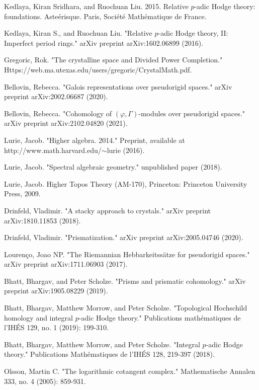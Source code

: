 \documentclass[11pt]{book}
\theoremstyle{definition}
\numberwithin{equation}{section}
\begin{document}
\begin{thebibliography}{10}
 Kedlaya, Kiran Sridhara, and Ruochuan Liu. 2015. Relative $p$-adic Hodge theory: foundations. Aste\'erisque. Paris, Soci\'et\'e Math\'ematique de France.

 Kedlaya, Kiran S., and Ruochuan Liu. "Relative $p$-adic Hodge theory, II: Imperfect period rings." arXiv preprint arXiv:1602.06899 (2016).


 Gregoric, Rok. "The crystalline space and Divided Power Completion." Https://web.ma.utexas.edu/users/gregoric/CrystalMath.pdf.


 Bellovin, Rebecca. "Galois representations over pseudorigid spaces." arXiv preprint arXiv:2002.06687 (2020).

 Bellovin, Rebecca. "Cohomology of $(\varphi,\Gamma) $-modules over pseudorigid spaces." arXiv preprint arXiv:2102.04820 (2021).



 Lurie, Jacob. "Higher algebra. 2014." Preprint, available at http://www.math.harvard.edu/$\sim$lurie (2016).

 Lurie, Jacob. "Spectral algebraic geometry." unpublished paper (2018).

 Lurie, Jacob. Higher Topos Theory (AM-170), Princeton: Princeton University Press, 2009. 

 Drinfeld, Vladimir. "A stacky approach to crystals." arXiv preprint arXiv:1810.11853 (2018).

 Drinfeld, Vladimir. "Prismatization." arXiv preprint arXiv:2005.04746 (2020). 


 Louren\c{c}o, Joao NP. "The Riemannian Hebbarkeitss\" atze for pseudorigid spaces." arXiv preprint arXiv:1711.06903 (2017).


 Bhatt, Bhargav, and Peter Scholze. "Prisms and prismatic cohomology." arXiv preprint arXiv:1905.08229 (2019).


 Bhatt, Bhargav, Matthew Morrow, and Peter Scholze. "Topological Hochschild homology and integral $ p $-adic Hodge theory." Publications math\'ematiques de l'IH\'ES 129, no. 1 (2019): 199-310.

 Bhatt, Bhargav, Matthew Morrow, and Peter Scholze. "Integral $p$-adic Hodge theory." Publications Math\'ematiques de l'IH\'ES 128, 219-397 (2018). 


 Olsson, Martin C. "The logarithmic cotangent complex." Mathematische Annalen 333, no. 4 (2005): 859-931.


\end{thebibliography}
\end{document}
